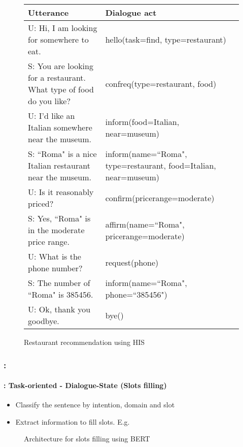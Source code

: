 \documentclass[xcolor=table]{beamer}
\begin{document}
\begin{frame}
\begin{figure}
		\begin{tabular}{p{}p{}}
			\hline
			Utterance & Dialogue act\\
			\hline
			U: Hi, I am looking for somewhere to eat.  & hello(task=find, type=restaurant) \\
			S: You are looking for a restaurant. What type of food do you like?  & confreq(type=restaurant, food) \\
			U: I'd like an Italian somewhere near the museum. & inform(food=Italian, near=museum)\\
			S: ``Roma" is a nice Italian restaurant near the museum.  & inform(name=``Roma", type=restaurant, food=Italian, near=museum) \\
			U: Is it reasonably priced? & confirm(pricerange=moderate) \\
			S: Yes, ``Roma" is in the moderate price range.  & affirm(name=``Roma", pricerange=moderate) \\
			U: What is the phone number? & request(phone) \\
			S: The number of ``Roma" is 385456. & inform(name=``Roma", phone=``385456") \\
			U: Ok, thank you goodbye. & bye() \\
			\hline
		\end{tabular}
		
		\caption{Restaurant recommendation using HIS \cite{2010-young-al}}
	\end{figure}
	
\end{frame}

\begin{frame}
	\frametitle{\insertshortsubtitle: \insertsection}
	\framesubtitle{\insertsubsection: Task-oriented - Dialogue-State (Slots filling)}
	
	\begin{itemize}
		\item Classify the sentence by intention, domain and slot
		\item Extract information to fill slots. E.g. 
	\end{itemize}
	
	\begin{figure}
		\centering
		\caption{Architecture for slots filling using BERT \cite{2020-jurafsky-martin}}
	\end{figure}
	
\end{frame}
\end{document}
